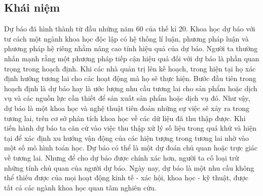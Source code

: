 \subsection{Khái niệm}
Dự báo đã hình thành từ đầu những năm 60 của thế kỉ 20. Khoa học dự báo với tư cách một ngành khoa học độc lập có hệ thống lí luận, phương pháp luận và phương pháp hệ riêng nhằm nâng cao tính hiệu quả của dự báo. Người ta thường nhấn mạnh rằng một phương pháp tiếp cận hiệu quả đối với dự báo là phần quan trọng trong hoạch định. Khi các nhà quản trị lên kế hoạch, trong hiện tại họ xác định hướng tương lai cho các hoạt động mà họ sẽ thực hiện. Bước đầu tiên trong hoạch định là dự báo hay là ước lượng nhu cầu tương lai cho sản phẩm hoặc dịch vụ và các nguồn lực cần thiết để sản xuất sản phẩm hoặc dịch vụ đó.
Như vậy, dự báo là một khoa học và nghệ thuật tiên đoán những sự việc sẽ xảy ra trong tương lai, trên cơ sở phân tích khoa học về các dữ liệu đã thu thập được.
Khi tiến hành dự báo ta căn cứ vào việc thu thập xử lý số liệu trong quá khứ và hiện tại để xác định xu hướng vận động của các hiện tượng trong tương lai nhờ vào một số mô hình toán học.
Dự báo có thể là một dự đoán chủ quan hoặc trực giác về tương lai. Nhưng để cho dự báo được chính xác hơn, người ta cố loại trừ những tính chủ quan của người dự báo.
Ngày nay, dự báo là một nhu cầu không thể thiếu được của mọi hoạt động kinh tế - xác hội, khoa học - kỹ thuật, được tất cả các ngành khoa học quan tâm nghiên cứu.

